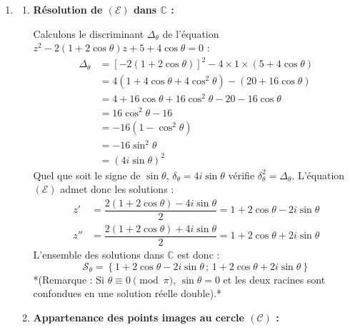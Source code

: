 \documentclass[12pt,a4paper]{article}
\begin{document}
\begin{enumerate}
    \item 
    \begin{enumerate}
        \item \textbf{Résolution de $(\mathcal{E})$ dans $\mathbb{C}$ :}
        
        Calculons le discriminant $\Delta_{\theta}$ de l'équation $z^2 - 2(1 + 2\cos\theta)z + 5 + 4\cos\theta = 0$ :
        $$
        \begin{aligned}
            \Delta_{\theta} &= \left[-2(1 + 2\cos\theta)\right]^2 - 4 \times 1 \times (5 + 4\cos\theta) \\
            &= 4(1 + 4\cos\theta + 4\cos^2\theta) - (20 + 16\cos\theta) \\
            &= 4 + 16\cos\theta + 16\cos^2\theta - 20 - 16\cos\theta \\
            &= 16\cos^2\theta - 16 \\
            &= -16(1 - \cos^2\theta) \\
            &= -16\sin^2\theta \\
            &= (4i\sin\theta)^2
        \end{aligned}
        $$
        Quel que soit le signe de $\sin\theta$, $\delta_{\theta} = 4i\sin\theta$ vérifie $\delta_{\theta}^2 = \Delta_{\theta}$. L'équation $(\mathcal{E})$ admet donc les solutions :
        $$
        \begin{aligned}
            z' &= \dfrac{2(1 + 2\cos\theta) - 4i\sin\theta}{2} = 1 + 2\cos\theta - 2i\sin\theta \\
            z'' &= \dfrac{2(1 + 2\cos\theta) + 4i\sin\theta}{2} = 1 + 2\cos\theta + 2i\sin\theta
        \end{aligned}
        $$
        L'ensemble des solutions dans $\mathbb{C}$ est donc :
        $$
        \mathcal{S}_{\theta} = \left\{ 1 + 2\cos\theta - 2i\sin\theta \,;\, 1 + 2\cos\theta + 2i\sin\theta \right\}
        $$
        *(Remarque : Si $\theta \equiv 0 \pmod{\pi}$, $\sin\theta = 0$ et les deux racines sont confondues en une solution réelle double).*

        \item \textbf{Appartenance des points images au cercle $(\mathcal{C})$ :}
        

\end{enumerate}
\end{enumerate}
\end{document}
